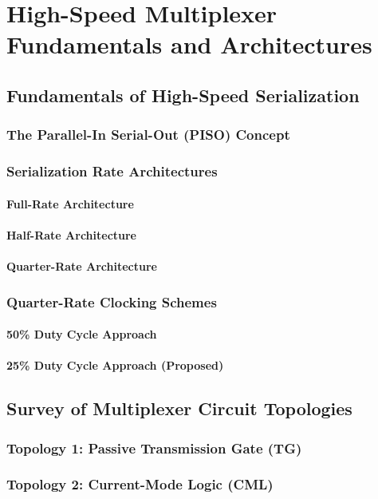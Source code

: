 \chapter{High-Speed Multiplexer Fundamentals and Architectures}
    \section{Fundamentals of High-Speed Serialization}
        \subsection{The Parallel-In Serial-Out (PISO) Concept}
        \subsection{Serialization Rate Architectures}
            \subsubsection{Full-Rate Architecture}
            \subsubsection{Half-Rate Architecture}
            \subsubsection{Quarter-Rate Architecture}
        \subsection{Quarter-Rate Clocking Schemes}
            \subsubsection{50\% Duty Cycle Approach}
            \subsubsection{25\% Duty Cycle Approach (Proposed)}
    \section{Survey of Multiplexer Circuit Topologies}
        \subsection{Topology 1: Passive Transmission Gate (TG)}
        \subsection{Topology 2: Current-Mode Logic (CML)}
